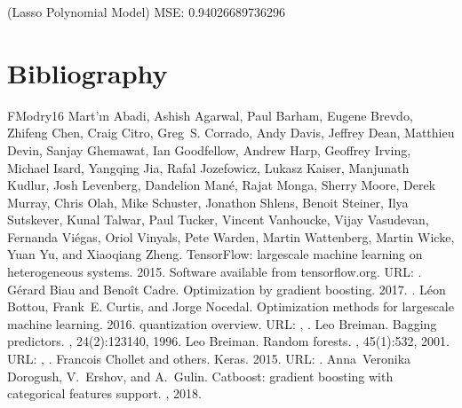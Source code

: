 \documentclass[letterpaper,10pt,english]{sphinxmanual}
\begin{document}
\begin{sphinxVerbatim}[commandchars=\\\{\}]
(Lasso Polynomial Model) MSE: 0.94026689736296
\end{sphinxVerbatim}


\section{Bibliography}
\label{\detokenize{zreferences:bibliography}}\label{\detokenize{zreferences::doc}}


\begin{sphinxthebibliography}{FModry16}
Mart’ın Abadi, Ashish Agarwal, Paul Barham, Eugene Brevdo, Zhifeng Chen, Craig Citro, Greg S. Corrado, Andy Davis, Jeffrey Dean, Matthieu Devin, Sanjay Ghemawat, Ian Goodfellow, Andrew Harp, Geoffrey Irving, Michael Isard, Yangqing Jia, Rafal Jozefowicz, Lukasz Kaiser, Manjunath Kudlur, Josh Levenberg, Dandelion Mané, Rajat Monga, Sherry Moore, Derek Murray, Chris Olah, Mike Schuster, Jonathon Shlens, Benoit Steiner, Ilya Sutskever, Kunal Talwar, Paul Tucker, Vincent Vanhoucke, Vijay Vasudevan, Fernanda Viégas, Oriol Vinyals, Pete Warden, Martin Wattenberg, Martin Wicke, Yuan Yu, and Xiaoqiang Zheng. TensorFlow: large\sphinxhyphen{}scale machine learning on heterogeneous systems. 2015. Software available from tensorflow.org. URL: .
Gérard Biau and Benoît Cadre. Optimization by gradient boosting. 2017. .
Léon Bottou, Frank E. Curtis, and Jorge Nocedal. Optimization methods for large\sphinxhyphen{}scale machine learning. 2016. quantization overview. URL: , .
Leo Breiman. Bagging predictors. , 24(2):123\textendash{}140, 1996.
Leo Breiman. Random forests. , 45(1):5\textendash{}32, 2001. URL: , .
Francois Chollet and others. Keras. 2015. URL: .
Anna Veronika Dorogush, V. Ershov, and A. Gulin. Catboost: gradient boosting with categorical features support. , 2018.

\end{sphinxthebibliography}
\end{document}
